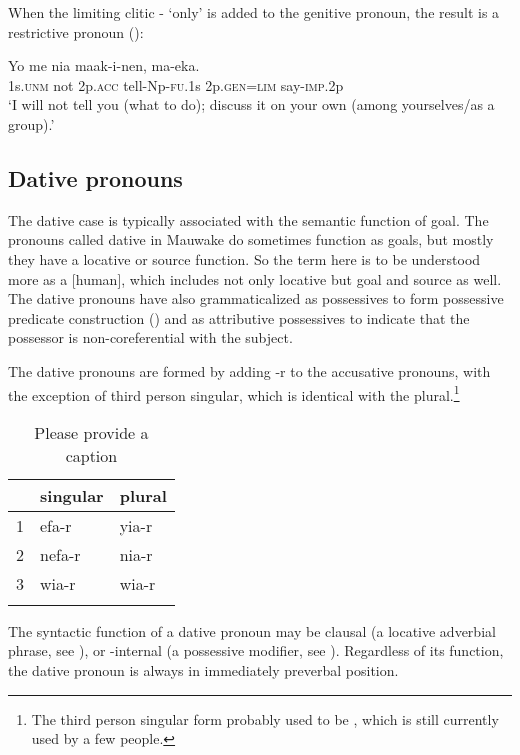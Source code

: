 When the limiting clitic - `only' is added to the genitive pronoun, the result is a restrictive pronoun ():

\ea%
\label{ex:3:x604}
\gll Yo me nia maak-i-nen,  ma-eka. \\
1s.\textsc{unm} not 2p.\textsc{acc} tell-Np-\textsc{fu}.1s 2p.\textsc{gen}=\textsc{lim} say-\textsc{imp}.2p\\
\glt`I will not tell you (what to do); discuss it on your own (among yourselves/as a group).'
\z

\subsection{Dative pronouns}\label{sec:3:y:x}
{}
The dative case is typically associated with the semantic function of goal. The pronouns called dative in Mauwake do sometimes function as goals, but mostly they have a locative or source function. So the term here is to be understood more as a [\textstyleEmphasizedWords{\textsc{+}}human]\textstyleEmphasizedWords{ }, which includes not only locative but goal and source as well. The dative pronouns have also grammaticalized as possessives to form possessive predicate construction () and as attributive possessives to indicate that the possessor is non-coreferential with the subject. 

The dative pronouns are formed by adding -r to the accusative pronouns, with the exception of third person singular, which is identical with the plural.\footnote{The third person singular form probably used to be , which is still currently used by a few people.}

\begin{table}
\caption{Please provide a caption}
\label{} 
\begin{tabular}{lll}
\mytoprule
 &singular &plural\\
\midrule
1 &efa-r &yia-r\\
2 &nefa-r &nia-r\\
3 &wia-r &wia-r\\
\mybottomrule
\end{tabular}
\end{table}


The syntactic function of a dative pronoun may be clausal (a locative adverbial phrase, see ), or -internal (a possessive modifier, see ). Regardless of its function, the dative pronoun is always in immediately preverbal position. 

